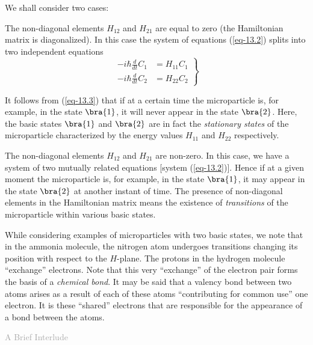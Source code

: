 \documentclass[a4paper,sfsidenotes,colorlinks=true]{tufte-book}
\numberwithin{equation}{section}
\numberwithin{figure}{section}
\begin{document}
We shall consider two cases: 
\\[5pt]
\begin{description}[leftmargin=1cm]
\item[First case.] The non-diagonal elements $H_{12}$ and $H_{21}$ are
  equal to zero (the Hamiltonian matrix is diagonalized). In this case
  the system of equations (\ref{eq-13.2}) splits into two independent
  equations
\begin{equation}%
\left.
\begin{split}
- i \hbar \frac{d}{dt} C_{1} & = H_{11}C_{1}  \\
- i \hbar \frac{d}{dt} C_{2} & = H_{22} C_{2} 
\end{split}
\right\}
\label{eq-13.3}
\end{equation}

It follows from (\ref{eq-13.3}) that if at a certain time the
microparticle is, for example, in the state $\bra{1}$, it will never appear
in the state $\bra{2}$. Here, the basic states $\bra{1}$ and $\bra{2}$ are in fact
the \emph{stationary states} of the microparticle characterized by the energy
values $H_{11}$ and $H_{22}$ respectively.

\item[Second case.] The non-diagonal elements $H_{12}$
and $H_{21}$ are non-zero. In this case, we have a system of two mutually
related equations [system (\ref{eq-13.2})]. Hence if at a given moment the
microparticle is, for example, in the state $\bra{1}$, it may appear in the
state  $\bra{2}$ at another instant of time. The presence of non-diagonal
elements in the Hamiltonian matrix means the existence of \emph{transitions}
of the microparticle within various basic states.  
\end{description}

While considering examples of microparticles with two basic states, we
note that in the ammonia molecule, the nitrogen atom undergoes
transitions changing its position with respect to the $H$-plane. The
protons in the hydrogen molecule ``exchange'' electrons. Note that
this very ``exchange'' of the electron pair forms the basis of a
\emph{chemical bond}. It may be said that a valency bond between two
atoms arises as a result of each of these atoms ``contributing for
common use'' one electron. It is these ``shared'' electrons that are
responsible for the appearance of a bond between the atoms.



\clearpage 


\textsf{\Large \textcolor{darkgray}{A Brief Interlude}}
\end{document}
